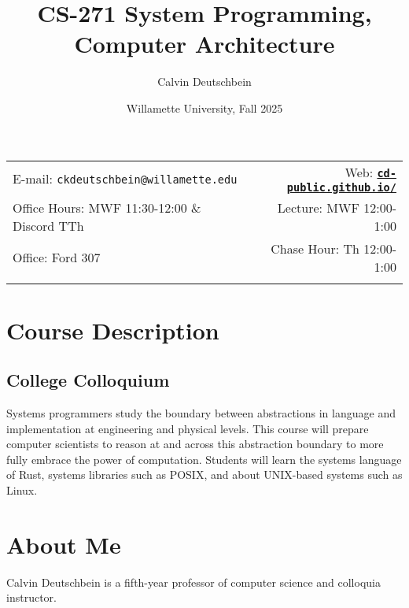\documentclass[11pt]{article}
\title{CS-271 System Programming, Computer Architecture}
\author{Calvin Deutschbein}
\date{Willamette University, Fall 2025}
\newcommand{\blankline}{\quad\pagebreak[2]}
\begin{document}
\maketitle

\blankline

\begin{tabular*}{.93\textwidth}{@{\extracolsep{\fill}}lr}


E-mail: \texttt{ckdeutschbein@willamette.edu} & Web: \href{https://cd-public.github.io/courses/soc}{\tt\bf cd-public.github.io/}  \\

 Office Hours: MWF 11:30-12:00 \& Discord TTh  &  Lecture: MWF 12:00-1:00 \\

 Office: Ford 307 & Chase Hour: Th 12:00-1:00  \\
 & \\
\hline
\end{tabular*}

\vspace{5 mm}


\section*{Course Description}

\subsection*{College Colloquium}

Systems programmers study the boundary between abstractions in language and implementation at engineering and physical levels. This course will prepare computer scientists to reason at and across this abstraction boundary to more fully embrace the power of computation. Students will learn the systems language of Rust, systems libraries such as POSIX, and about UNIX-based systems such as Linux.

\section*{About Me}
Calvin Deutschbein is a 
fifth-year professor of computer science and colloquia instructor.

\end{document}
